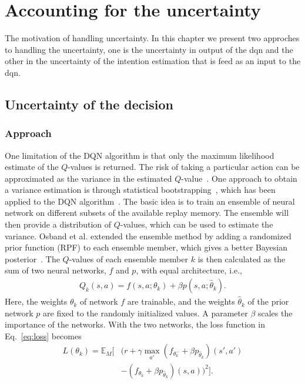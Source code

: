 \chapter{Accounting for the uncertainty}\label{ch:uncertainty}

The motivation of handling uncertainty. In this chapter we present two approches to handling the uncertainty, one is the uncertainty in output of the \gls{dqn} and the other in the uncertainty of the intention estimation that is feed as an input to the \gls{dqn}.


\section{Uncertainty of the decision}


\subsection{Approach}
One limitation of the DQN algorithm is that only the maximum likelihood estimate of the $Q$-values is returned. The risk of taking a particular action can be approximated as the variance in the estimated $Q$-value~\cite{Garcia2015}. One approach to obtain a variance estimation is through statistical bootstrapping~\cite{Efron1982}, which has been applied to the DQN algorithm~\cite{Osband2016}. The basic idea is to train an ensemble of neural network on different subsets of the available replay memory. The ensemble will then provide a distribution of $Q$-values, which can be used to estimate the variance. Osband et al. extended the ensemble method by adding a randomized prior function (RPF) to each ensemble member, which gives a better Bayesian posterior~\cite{Osband2018}. The $Q$-values of each ensemble member $k$ is then calculated as the sum of two neural networks, $f$ and $p$, with equal architecture, i.e.,
%
\begin{align}
	Q_k(s,a) = f(s,a;\theta_k) + \beta p(s,a;\hat{\theta}_k).
\end{align}
%
Here, the weights $\theta_k$ of network $f$ are trainable, and the weights $\hat{\theta}_k$ of the prior network $p$ are fixed to the randomly initialized values. A parameter $\beta$ scales the importance of the networks. With the two networks, the loss function in Eq.~\ref{eq:loss} becomes
%
\begin{align}
	\label{eq:loss_boot}
	L(\theta_k) = \mathbb{E}_M \Big[ & (r + \gamma \max_{a'} (f_{\theta^-_k}+\beta p_{\hat{\theta}_k})(s',a') \nonumber \\
	& - (f_{\theta_k}+ \beta p_{\hat{\theta}_k})(s,a) )^2 \Big].
\end{align} 

